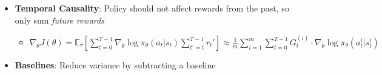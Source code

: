 \documentclass[twocolumn]{article}
\providecommand{\tightlist}{%
  \setlength{\itemsep}{\GlobalItemSep}\setlength{\parskip}{\GlobalListParSkip}}
\newlength{\GlobalItemSep}
\newlength{\GlobalListParSkip}
\begin{document}
\begin{itemize}
  \begin{itemize}
  \tightlist
  \item
    To get this in a differentiable form:

    \begin{itemize}
    \tightlist
    \item
      \(\nabla_\theta J(\theta) = \nabla_\theta \sum_\tau P(\tau ; \theta) R(\tau) = \sum_\tau P(\tau; \theta) R(\tau) \nabla_\theta \log P(\tau; \theta)\)
      (\textbf{log ratio trick})
    \item
      \(\approx \frac{1}{m}\sum_{i=1}^m R(\tau_i) \nabla_\theta \log P(\tau_i; \theta)\)
      (\textbf{estimate of expectation over \(\tau\)})
    \item
      \(= \frac{1}{m}\sum_{i=1}^m R(\tau_i) \nabla_\theta \log [\mu(s_0) \prod_{t=0}^{T-1} \pi_\theta (a_t | s_t) p(s_{t+1} | s_t, a_t)]\)
      (\textbf{decomposition of \(P\)})
    \item
      \(= \frac{1}{m}\sum_{i=1}^m R(\tau_i) \nabla_\theta [\log \mu(s_0) + \sum_{t=0}^{T-1} \log \pi_\theta (a_t | s_t) + \log p(s_{t+1} | s_t, a_t)]\)
      (\textbf{can eliminate transition dynamics since they are not a
      function of \(\theta\)})
    \item
      \(\nabla_\theta J(\theta) \approx \frac{1}{m} \sum_{i=1}^m R(\tau_i) \sum_{t=0}^{T-1} \nabla_\theta \log \pi_\theta (a^i_t | s^i_t)\)

      \begin{itemize}
      \tightlist
      \item
        This is shifting the distribution (\(\pi\)) through parameter
        \(\theta\) in a way to ensure future samples achieve higher
        scores based on the reward function - this is akin to
        \textbf{weighted maximum likelihood}
      \end{itemize}
    \end{itemize}
  \end{itemize}
\item
  \textbf{Temporal Causality}: Policy should not affect rewards from the
  past, so only sum \emph{future rewards}

  \begin{itemize}
  \tightlist
  \item
    \(\nabla_\theta J(\theta) = \mathbb{E}_\tau [\sum_{t=0}^{T-1} \nabla_\theta \log \pi_\theta (a_t | s_t) \sum_{t' = t}^{T-1} r_t'] \approx \frac{1}{m} \sum_{i=1}^m \sum_{t = 0}^{T-1} G_t^{(i)} \cdot \nabla_\theta \log \pi_\theta (a^i_t | s^i _t)\)
  \end{itemize}
\item
  \textbf{Baselines}: Reduce variance by subtracting a baseline


\end{itemize}
\end{document}
